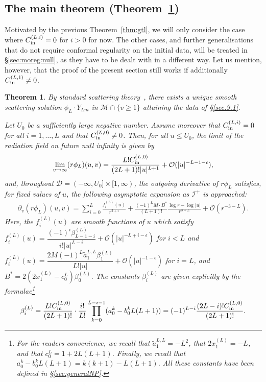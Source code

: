 \documentclass[11pt,english]{article}
\numberwithin{equation}{section}
\newtheorem{thm}{Theorem}[section]
\theoremstyle{remark}
\theoremstyle{plain}
\theoremstyle{remark}
\newcommand{\pv}{\partial_v}
\renewcommand{\(}{\left(}
\renewcommand{\)}{\right)}
\begin{document}
\subsection{The main theorem (Theorem~\ref{thm:gnl})}
Motivated by the previous Theorem~\ref{thm:gtl}, we will only consider the case where $C_{\mathrm{in}}^{(L,i)}=0$ for $i>0$ for now.  
The other cases, and further generalisations that do not require conformal regularity on the initial data, will be treated in \S \ref{sec:moreg:null}, as they have to be dealt with in a different way. 
Let us mention, however, that the proof of the present section still works if additionally $C_{\mathrm{in}}^{(L,1)}\neq 0$.

\begin{thm}\label{thm:gnl}
By standard scattering theory~\cite{DRSR18}, there exists a unique smooth scattering solution $\phi_L\cdot Y_{Lm}$ in $\mathcal{M}\cap\{v\geq 1\}$ attaining the data of \S\ref{sec.9.1}.

Let $U_0$ be a sufficiently large negative number. Assume moreover that $C_{\mathrm{in}}^{(L,i)}=0$ for all $i=1,\dots, L$ and that $C_{\mathrm{in}}^{(L,0)}\neq0$. Then, for all $u\leq U_0$, the limit of the radiation field on future null infinity is given by
\begin{align}\label{eq:thm:gnl limphi}
\lim_{v\to\infty}(r\phi_L)(u,v)=\frac{L!C_{\mathrm{in}}^{(L,0)}}{(2L+1)!|u|^{L+1}}+\mathcal{O}(|u|^{-L-1-\epsilon}),
\end{align}
and, throughout $\mathcal{D}=(-\infty,U_0]\times[1,\infty)$, the outgoing derivative of $r\phi_L$ satisfies, for fixed values of $u$, the following asymptotic expansion as $\mathcal{I}^+$ is approached:
\begin{align}\label{eq:thm:gnl asydvphi}
\pv(r\phi_L)(u,v)=\sum_{i=0}^L \frac{f_i^{(L)}(u)}{r^{2+i}}+\frac{ (-1)^LM\cdot B^*}{(L+1)!}\frac{\log r-\log|u|}{r^{3+L}}+\mathcal{O}(r^{-3-L}).
\end{align}
Here, the $f^{(L)}_i(u)$ are smooth functions of $u$ which satisfy $f^{(L)}_i(u)=\dfrac{(-1)^i\beta_{L-1-i}^{(L)}}{i!|u|^{L-i}}+\mathcal{O}(|u|^{-L+i-\epsilon})$ for $i<L$ and $f^{(L)}_i(u)=\dfrac{2M(-1)^L\tilde a^{L,L}_1\beta_1^{(L)}}{L!|u|}+\mathcal{O}(|u|^{-1-\epsilon})$ for $i=L$, and $
B^*=2(2x_1^{(L)}-c_0^L)\beta_0^{(L)}
$.   
The constants $\beta_i^{(L)}$ are given explicitly by the formulae\footnote{For the readers convenience, we recall that $\tilde a_1^{L,L}=-L^2$, that $2x_1^{(L)}=-L$, and that $c_0^L=1+2L(L+1)$. 
Finally, we recall that $a_0^k-b_0^kL(L+1)=k(k+1)-L(L+1)$. 
All these constants have been defined in \S \ref{sec:generalNP}.}
\begin{align}
\beta_i^{(L)}=\frac{L!C_{\mathrm{in}}^{(L,0)}}{(2L+1)!}\cdot\frac{i!}{L!}\prod_{k=0}^{L-i-1} ( a_0^k -b_0^kL(L+1))=(-1)^{L-i}\frac{(2L-i)!C_{\mathrm{in}}^{(L,0)}}{(2L+1)!}.
\end{align}


\end{thm}
\end{document}
